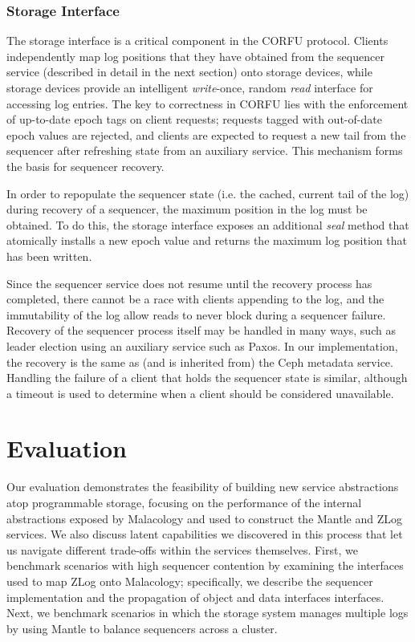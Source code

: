 \documentclass[preprint]{sigplanconf-eurosys}
\begin{document}
\subsubsection{Storage Interface}

The storage interface is a critical component in the CORFU protocol. Clients
independently map log positions that they have obtained from the sequencer
service (described in detail in the next section) onto storage devices, while
storage devices provide an intelligent \emph{write}-once, random \emph{read}
interface for accessing log entries. The key to correctness in CORFU lies with
the enforcement of up-to-date epoch tags on client requests; requests tagged
with out-of-date epoch values are rejected, and clients are expected to
request a new tail from the sequencer after refreshing state from an auxiliary
service.  This mechanism forms the basis for sequencer recovery.

In order to repopulate the sequencer state (i.e. the cached, current tail of
the log) during recovery of a sequencer, the maximum position in the log must
be obtained. To do this, the storage interface exposes an additional
\emph{seal} method that atomically installs a new epoch value and returns the
maximum log position that has been written.

Since the sequencer service does not resume until the recovery process has
completed, there cannot be a race with clients appending to the log, and the
immutability of the log allow reads to never block during a sequencer failure.
Recovery of the sequencer process itself may be handled in many ways, such as
leader election using an auxiliary service such as Paxos. In our
implementation, the recovery is the same as (and is inherited from) the Ceph
metadata service. Handling the failure of a client that holds the sequencer
state is similar, although a timeout is used to determine when a client should
be considered unavailable.

\section{Evaluation}
\label{sec:evaluation} 


Our evaluation demonstrates the feasibility of building new service
abstractions atop programmable storage, focusing on the performance of the
internal abstractions exposed by Malacology and used to construct the Mantle
and ZLog services. We also discuss latent capabilities we discovered in this
process that let us navigate different trade-offs within the services
themselves. First, we benchmark scenarios with high sequencer contention by
examining the interfaces used to map ZLog onto Malacology; specifically, we
describe the sequencer implementation and the propagation of object and data
interfaces interfaces.  Next, we benchmark scenarios in which the storage
system manages multiple logs by using Mantle to balance sequencers across a
cluster.
\end{document}
